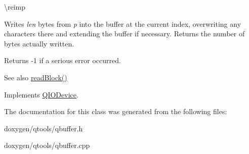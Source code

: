 \textbackslash{}reimp

Writes {\itshape len} bytes from {\itshape p} into the buffer at the current index, overwriting any characters there and extending the buffer if necessary. Returns the number of bytes actually written.

Returns -\/1 if a serious error occurred.

\begin{DoxySeeAlso}{See also}
\mbox{\hyperlink{class_q_buffer_a7deacf4bbd599f075f3dad4b20cafeb0}{read\+Block()}} 
\end{DoxySeeAlso}


Implements \mbox{\hyperlink{class_q_i_o_device_a5d937df1bde2f956872dd54e077807d1}{Q\+I\+O\+Device}}.



The documentation for this class was generated from the following files\+:\begin{DoxyCompactItemize}
\item 
doxygen/qtools/qbuffer.\+h\item 
doxygen/qtools/qbuffer.\+cpp\end{DoxyCompactItemize}
